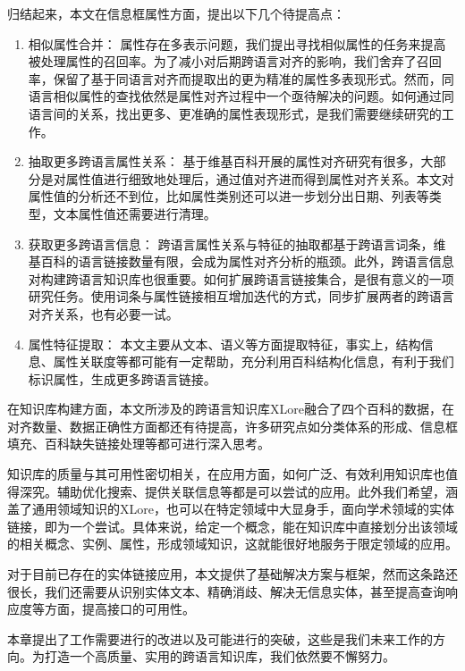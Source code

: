 归结起来，本文在信息框属性方面，提出以下几个待提高点：
\begin{enumerate}[1)]
\item {\heiti 相似属性合并：} 属性存在多表示问题，我们提出寻找相似属性的任务来提高被处理属性的召回率。为了减小对后期跨语言对齐的影响，我们舍弃了召回率，保留了基于同语言对齐而提取出的更为精准的属性多表现形式。然而，同语言相似属性的查找依然是属性对齐过程中一个亟待解决的问题。如何通过同语言间的关系，找出更多、更准确的属性表现形式，是我们需要继续研究的工作。
\item {\heiti 抽取更多跨语言属性关系：} 基于维基百科开展的属性对齐研究有很多，大部分是对属性值进行细致地处理后，通过值对齐进而得到属性对齐关系。本文对属性值的分析还不到位，比如属性类别还可以进一步划分出日期、列表等类型，文本属性值还需要进行清理。
\item {\heiti 获取更多跨语言信息：} 跨语言属性关系与特征的抽取都基于跨语言词条，维基百科的语言链接数量有限，会成为属性对齐分析的瓶颈。此外，跨语言信息对构建跨语言知识库也很重要。如何扩展跨语言链接集合，是很有意义的一项研究任务。使用词条与属性链接相互增加迭代的方式，同步扩展两者的跨语言对齐关系，也有必要一试。
\item {\heiti 属性特征提取：} 本文主要从文本、语义等方面提取特征，事实上，结构信息、属性关联度等都可能有一定帮助，充分利用百科结构化信息，有利于我们标识属性，生成更多跨语言链接。
\end{enumerate}

在知识库构建方面，本文所涉及的跨语言知识库XLore融合了四个百科的数据，在对齐数量、数据正确性方面都还有待提高，许多研究点如分类体系的形成、信息框填充、百科缺失链接处理等都可进行深入思考。

知识库的质量与其可用性密切相关，在应用方面，如何广泛、有效利用知识库也值得深究。辅助优化搜索、提供关联信息等都是可以尝试的应用。此外我们希望，涵盖了通用领域知识的XLore，也可以在特定领域中大显身手，面向学术领域的实体链接，即为一个尝试。具体来说，给定一个概念，能在知识库中直接划分出该领域的相关概念、实例、属性，形成领域知识，这就能很好地服务于限定领域的应用。

对于目前已存在的实体链接应用，本文提供了基础解决方案与框架，然而这条路还很长，我们还需要从识别实体文本、精确消歧、解决无信息实体，甚至提高查询响应度等方面，提高接口的可用性。

本章提出了工作需要进行的改进以及可能进行的突破，这些是我们未来工作的方向。为打造一个高质量、实用的跨语言知识库，我们依然要不懈努力。

